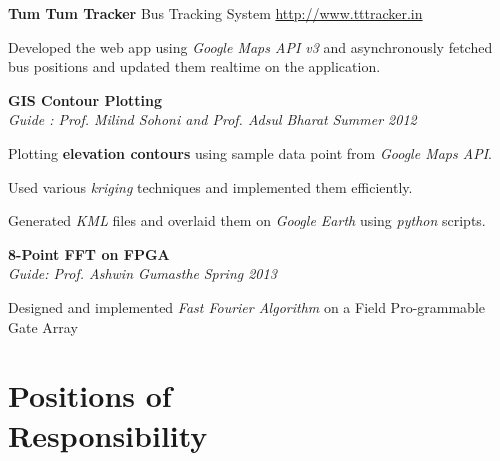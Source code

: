 \documentclass[margin,11pt]{resume}
\begin{document}
\begin{resume}
\textbf{Tum Tum Tracker} \hfill Bus Tracking System \hfill
    \url{http://www.tttracker.in}
\begin{list2}
\item Developed the web app using \emph{Google Maps API v3} and asynchronously fetched bus positions and updated them realtime  on the application.
\end{list2}


\textbf{GIS Contour Plotting}\\
  \textsl{Guide : Prof. Milind Sohoni and Prof. Adsul Bharat} \hfill \emph{Summer 2012}
\begin{list2}
\item Plotting \textbf{elevation contours} using sample data point from \emph{Google Maps API}.
\item Used various \emph{kriging} techniques and implemented them efficiently.
\item Generated \emph{KML} files and overlaid them on \emph{Google Earth} using \emph{python} scripts. \\
\end{list2}

\textbf{8-Point FFT on FPGA}\\ \textsl{Guide: Prof. Ashwin Gumasthe} \hfill \emph{Spring 2013}
\begin{list2}
\item Designed and implemented \emph{Fast Fourier Algorithm} on a Field Pro-grammable Gate Array 
\end{list2}



\section{\mysidestyle Positions of\\Responsibility } 



\end{resume}
\end{document}
